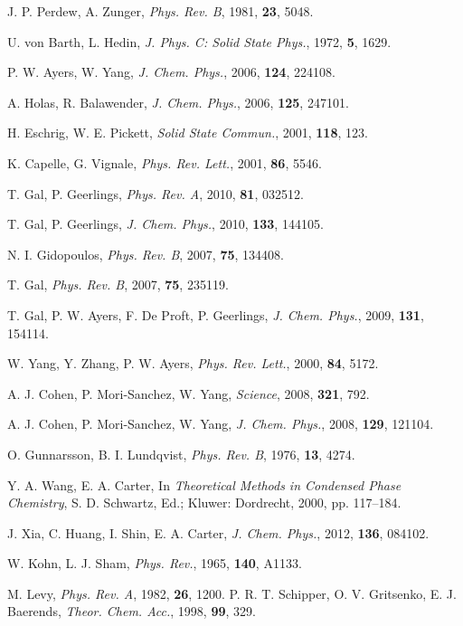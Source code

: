 \documentclass[%
 preprint, linenumbers,
 amsmath,amssymb,
 aps, physrev,
]{revtex4-2}
\begin{document}
\begin{thebibliography}{144}
 J. P. Perdew, A. Zunger, \textit{Phys. Rev. B}, 1981, \textbf{23}, 5048.

 U. von Barth, L. Hedin, \textit{J. Phys. C: Solid State Phys.}, 1972, \textbf{5}, 1629.

 P. W. Ayers, W. Yang, \textit{J. Chem. Phys.}, 2006, \textbf{124}, 224108.

 A. Holas, R. Balawender, \textit{J. Chem. Phys.}, 2006, \textbf{125}, 247101.

 H. Eschrig, W. E. Pickett, \textit{Solid State Commun.}, 2001, \textbf{118}, 123.

 K. Capelle, G. Vignale, \textit{Phys. Rev. Lett.}, 2001, \textbf{86}, 5546.

 T. Gal, P. Geerlings, \textit{Phys. Rev. A}, 2010, \textbf{81}, 032512.

 T. Gal, P. Geerlings, \textit{J. Chem. Phys.}, 2010, \textbf{133}, 144105.

 N. I. Gidopoulos, \textit{Phys. Rev. B}, 2007, \textbf{75}, 134408.

 T. Gal, \textit{Phys. Rev. B}, 2007, \textbf{75}, 235119.

 T. Gal, P. W. Ayers, F. De Proft, P. Geerlings, \textit{J. Chem. Phys.}, 2009, \textbf{131}, 154114.

 W. Yang, Y. Zhang, P. W. Ayers, \textit{Phys. Rev. Lett.}, 2000, \textbf{84}, 5172.

 A. J. Cohen, P. Mori-Sanchez, W. Yang, \textit{Science}, 2008, \textbf{321}, 792.

 A. J. Cohen, P. Mori-Sanchez, W. Yang, \textit{J. Chem. Phys.}, 2008, \textbf{129}, 121104.

 O. Gunnarsson, B. I. Lundqvist, \textit{Phys. Rev. B}, 1976, \textbf{13}, 4274.

 Y. A. Wang, E. A. Carter, In \textit{Theoretical Methods in Condensed Phase Chemistry}, S. D. Schwartz, Ed.; Kluwer: Dordrecht, 2000, pp. 117–184.

 J. Xia, C. Huang, I. Shin, E. A. Carter, \textit{J. Chem. Phys.}, 2012, \textbf{136}, 084102.

 W. Kohn, L. J. Sham, \textit{Phys. Rev.}, 1965, \textbf{140}, A1133.

 M. Levy, \textit{Phys. Rev. A}, 1982, \textbf{26}, 1200.
 P. R. T. Schipper, O. V. Gritsenko, E. J. Baerends, \textit{Theor. Chem. Acc.}, 1998, \textbf{99}, 329.


\end{thebibliography}
\end{document}
